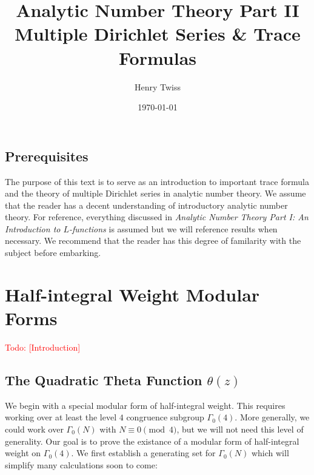 \documentclass[12pt]{book}
\title{Analytic Number Theory Part II \\  \large{Multiple Dirichlet Series \& Trace Formulas}}
\author{Henry Twiss}
\date{\today}
\theoremstyle{definition}\newframedtheorem{method}{Method}
\renewcommand{\t}{\theta}
\newcommand{\G}{\Gamma}
\newcommand{\<}{\langle}
\renewcommand{\>}{\rangle}
\newcommand{\todo}[1]{\textcolor{red}{\sf Todo: [#1]}}
\begin{document}
\maketitle
\thispagestyle{fancy}

\newpage

\section*{Prerequisites}
  The purpose of this text is to serve as an introduction to important trace formula and the theory of multiple Dirichlet series in analytic number theory. We assume that the reader has a decent understanding of introductory analytic number theory. For reference, everything discussed in \textit{Analytic Number Theory Part I: An Introduction to $L$-functions} is assumed but we will reference results when necessary. We recommend that the reader has this degree of familarity with the subject before embarking.

\newpage

\tableofcontents

\newpage

\chapter{Half-integral Weight Modular Forms}
  \todo{Introduction}
  \section{The Quadratic Theta Function \texorpdfstring{$\t(z)$}{O(z)}}
    We begin with a special modular form of half-integral weight. This requires working over at least the level $4$ congruence subgroup $\G_{0}(4)$. More generally, we could work over $\G_{0}(N)$ with $N \equiv 0 \pmod{4}$, but we will not need this level of generality. Our goal is to prove the existance of a modular form of half-integral weight on $\G_{0}(4)$. We first establish a generating set for $\G_{0}(N)$ which will simplify many calculations soon to come:
\end{document}
